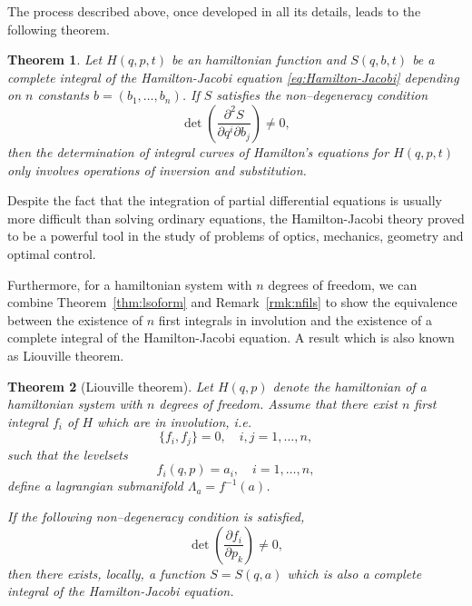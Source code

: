 \documentclass[english,fontsize=11pt,paper=a5,oneside]{scrbook}
\newtheorem{theorem}{Theorem}[chapter]
\theoremstyle{definition}
\begin{document}
The process described above, once developed in all its details, leads to the following theorem.

\begin{theorem}
    Let $H(q,p,t)$ be an hamiltonian function and $S(q,b,t)$ be a complete integral of the Hamilton-Jacobi equation \eqref{eq:Hamilton-Jacobi} depending on $n$ constants $b=(b_1,\ldots,b_n)$. If $S$ satisfies the non--degeneracy condition
    \begin{equation}
        \det\left(\frac{\partial^2 S}{\partial q^i \partial b_j}\right) \neq 0,
    \end{equation}
    then the determination of integral curves of Hamilton's equations for $H(q,p,t)$ only involves operations of inversion and substitution.
\end{theorem}

Despite the fact that the integration of partial differential equations is usually more difficult than solving ordinary equations, the Hamilton-Jacobi theory proved to be a powerful tool in the study of problems of optics, mechanics, geometry and optimal control.

Furthermore, for a hamiltonian system with $n$ degrees of freedom, we can combine Theorem~\ref{thm:lsoform} and Remark~\ref{rmk:nfils} to show the equivalence between the existence of $n$ first integrals in involution and the existence of a complete integral of the Hamilton-Jacobi equation.
A result which is also known as Liouville theorem.

\begin{theorem}[Liouville theorem]
    Let $H(q,p)$ denote the hamiltonian of a hamiltonian system with $n$ degrees of freedom.
    Assume that there exist $n$ first integral $f_i$ of $H$ which are in involution, i.e.
    \begin{equation}
        \big\{ f_i, f_j\big\} = 0, \quad i,j = 1,\ldots, n,
    \end{equation}
    such that the levelsets
    \begin{equation}
        f_i(q,p) = a_i, \quad i=1,\ldots,n,
    \end{equation}
    define a lagrangian submanifold $\Lambda_a = f^{-1}(a)$.

    If the following non--degeneracy condition is satisfied,
    \begin{equation}
        \det\left(\frac{\partial f_i}{\partial p_k}\right)\neq 0,
    \end{equation}
    then there exists, locally, a function $S=S(q,a)$ which is also a complete integral of the Hamilton-Jacobi equation.
\end{theorem}
\end{document}
